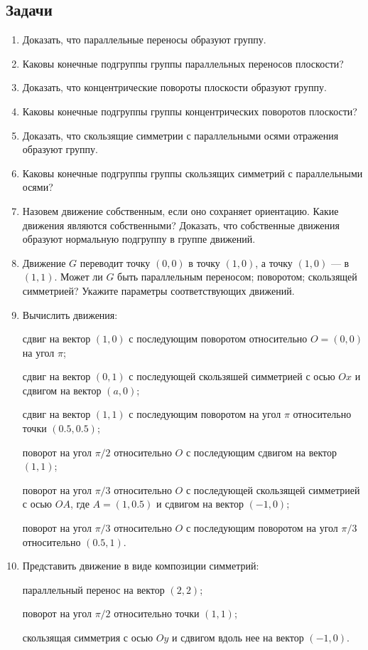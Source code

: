 \subsection*{Задачи}

\begin{enumerate}
\item Доказать, что параллельные переносы образуют группу.
\item Каковы конечные подгруппы группы параллельных переносов плоскости?
\item Доказать, что концентрические повороты плоскости образуют группу.
\item Каковы конечные подгруппы группы концентрических поворотов плоскости?
\item Доказать, что скользящие симметрии с параллельными осями отражения образуют группу.
\item Каковы конечные подгруппы группы скользящих симметрий с параллельными осями?
\item Назовем движение собственным, если оно сохраняет ориентацию. Какие движения являются собственными? Доказать, что собственные движения образуют нормальную подгруппу в группе движений.
\item Движение $G$ переводит точку $(0,0)$ в точку $(1,0)$, а точку $(1,0)$ --- в $(1,1)$. Может ли $G$ быть \ipunkt параллельным переносом; \ipunkt поворотом; \ipunkt скользящей симметрией? Укажите параметры соответствующих движений.
\item Вычислить движения:

\noindent\ipunkt сдвиг на вектор $(1,0)$ с последующим поворотом относительно $O=(0,0)$ на угол $\pi$;

\noindent\ipunkt сдвиг на вектор $(0,1)$ с последующей скользяшей симметрией с осью $Ox$ и сдвигом на вектор $(a,0)$;

\noindent\ipunkt сдвиг на вектор $(1,1)$ с последующим поворотом на угол $\pi$ относительно точки $(0.5,0.5)$;

\noindent\ipunkt поворот на угол $\pi/2$ относительно $O$ с последующим сдвигом на вектор $(1,1)$;

\noindent\ipunkt поворот на угол $\pi/3$ относительно $O$ с последующей скользящей симметрией с осью $OA$, где $A=(1,0.5)$ и сдвигом на вектор $(-1,0)$;

\noindent\ipunkt поворот на угол $\pi/3$ относительно $O$ с последующим поворотом на угол $\pi/3$ относительно $(0.5,1)$.

\item Представить движение в виде композиции симметрий:

\noindent\ipunkt параллельный перенос на вектор $(2,2)$;

\noindent\ipunkt поворот на угол $\pi/2$ относительно точки $(1,1)$;

\noindent\ipunkt скользящая симметрия с осью $Oy$ и сдвигом вдоль нее на вектор $(-1,0)$.

\end{enumerate}








